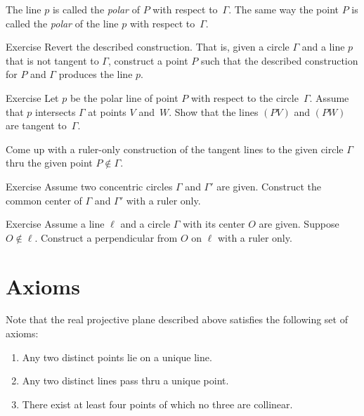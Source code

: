 The line $p$ is called the \emph{polar} of $P$ with respect to~$\Gamma$.
The same way the point $P$ is called the \emph{polar} of the line $p$ with respect to~$\Gamma$.

\begin{thm}{Exercise}\label{ex:revert}
Revert the described construction.
That is, given a circle $\Gamma$ and a line $p$ that is not tangent to $\Gamma$, construct a point $P$ such that the described construction for $P$ and $\Gamma$ produces the line $p$.
\end{thm}


\begin{thm}{Exercise}\label{ex:tangent ruler}
Let $p$ be the polar line of point $P$ with respect to the circle~$\Gamma$.
Assume that $p$ intersects $\Gamma$ at points $V$ and~$W$.
Show that the lines $(PV)$ and $(PW)$ are tangent to~$\Gamma$.

Come up with a ruler-only construction of the tangent lines to the given circle $\Gamma$ thru the given point $P\notin\Gamma$.
\end{thm}

\begin{thm}{Exercise}\label{ex:concentric-circ}
Assume two concentric circles $\Gamma$ and $\Gamma'$ are given.
Construct the common center of $\Gamma$ and $\Gamma'$ with a ruler only.
\end{thm}

\begin{thm}{Exercise}\label{ex:proj-perp}
Assume a line $\ell$ and a circle $\Gamma$ with its center $O$ are given.
Suppose $O\notin \ell$.
Construct a perpendicular from $O$ on $\ell$ with a ruler only.
\end{thm}

\section*{Axioms}

Note that the real projective plane described above satisfies the following set of axioms:

\begin{framed}

\begin{enumerate}[p-I.]
\item\label{def:proj-axioms:1} Any two distinct points lie on a unique line.
\item\label{def:proj-axioms:2} Any two distinct lines pass thru a unique point.
\item\label{def:proj-axioms:3} There exist at least four points of which no three are collinear.
\end{enumerate}

\end{framed}

